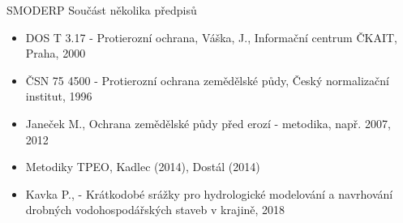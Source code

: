     \begin{frame}{SMODERP}
        Součást několika předpisů\\[1em]
        \begin{itemize}
            \item DOS T 3.17 - Protierozní ochrana, Váška, J., Informační centrum ČKAIT, Praha, 2000
            \item ČSN 75 4500 -  Protierozní ochrana zemědělské půdy, Český normalizační institut, 1996
            \item Janeček M., Ochrana zemědělské půdy před erozí - metodika, např. 2007, 2012
            \item Metodiky TPEO, Kadlec (2014), Dostál (2014)
            \item Kavka P., - Krátkodobé srážky pro hydrologické modelování a navrhování drobných vodohospodářských staveb v krajině, 2018
        \end{itemize}
    \end{frame}


